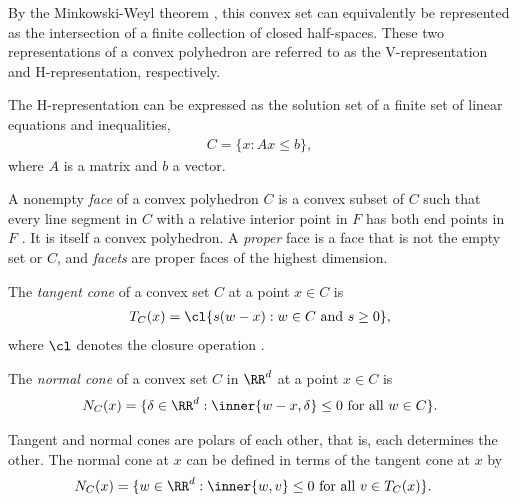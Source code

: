   By the Minkowski-Weyl theorem \citep[Theorem 19.1]{Rockafellar:1970}, this convex 
set can equivalently be represented as the intersection of a finite collection of 
closed half-spaces.  These two representations of a convex polyhedron are referred to 
as the V-representation and H-representation, respectively.  

The H-representation can be expressed as the solution set of a finite set of linear 
equations and inequalities,
\begin{align*}
	C = \{x: Ax \leq b \},
\end{align*}
where $A$ is a matrix and $b$ a vector.

A nonempty \emph{face} of a convex polyhedron $C$ is a convex subset of $C$ such that 
every line segment in $C$ with a relative interior point in $F$ has both end points in 
$F$ \citep{Rockafellar:1970}.  It is itself a convex polyhedron.
A \emph{proper} face is a face that is not the empty set or $C$, and 
\emph{facets} are proper faces of the highest dimension.

The \emph{tangent cone} of a convex set $C$ at a point $x \in C$ is
\begin{align*}
	T_C(x) = \cl\{s(w-x):w \in C \text{ and } s \geq 0 \},
\end{align*}
where $\cl$ denotes the closure operation \citep[Theorem 6.9]{Rockafellar}.  

The \emph{normal cone} of a convex set $C$ in $\RR^d$ at a point $x \in C$ is 
\begin{align*}
	N_C(x) = \{ \delta \in \RR^d: \inner{w-x,\delta} \leq 0 \text{ for all } w \in C 
\}.
\end{align*}

Tangent and normal cones are polars of each other, that is, each determines the other.  
The normal cone at $x$ can be defined in terms of the tangent cone at $x$ by
\begin{align*}
	N_C(x) 	&= \{ w \in \RR^d: \inner{ w, v } \leq 0 \text{ for all } v \in T_C(x) \}.
\end{align*}

